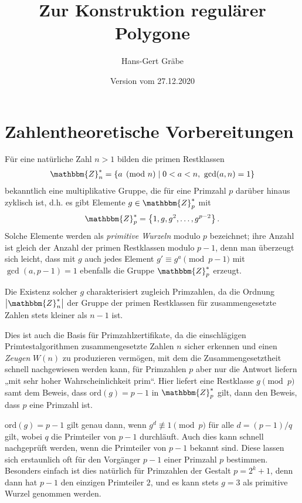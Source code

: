 \documentclass[11pt]{article}
\author{Hans-Gert Gräbe}
\title{Zur Konstruktion regulärer Polygone}
\date{Version vom 27.12.2020}
\newcommand{\cbr}[1]{\ensuremath{\left\{#1\right\}}}
\newcommand{\Z}{\mathbbm{Z}}
\begin{document}
 
\maketitle         

\section{Zahlentheoretische Vorbereitungen}

Für eine natürliche Zahl $n>1$ bilden die primen Restklassen
\begin{gather*}
  \Z_n^\ast=\cbr{a \pmod n \mid 0<a<n,\ \gcd(a,n)=1}
\end{gather*}
bekanntlich eine multiplikative Gruppe, die für eine Primzahl $p$ darüber
hinaus zyklisch ist, d.h. es gibt Elemente $g\in \Z_p^\ast$ mit
\begin{gather*}
  \Z_p^\ast=\cbr{1,g,g^2,\dots,g^{p-2}}.
\end{gather*}
Solche Elemente werden als \emph{primitive Wurzeln} modulo $p$ bezeichnet;
ihre Anzahl ist gleich der Anzahl der primen Restklassen modulo $p-1$, denn
man überzeugt sich leicht, dass mit $g$ auch jedes Element $g'\equiv g^a
\pmod{p-1}$ mit $\gcd(a,p-1)=1$ ebenfalls die Gruppe $\Z_p^\ast$ erzeugt.

Die Existenz solcher $g$ charakterisiert zugleich Primzahlen, da die Ordnung
$\left|\Z_n^\ast\right|$ der Gruppe der primen Restklassen für
zusammengesetzte Zahlen stets kleiner als $n-1$ ist.

Dies ist auch die Basis für Primzahlzertifikate, da die einschlägigen
Primtestalgorithmen zusammengesetzte Zahlen $n$ sicher erkennen und einen
\emph{Zeugen} $W(n)$ zu produzieren vermögen, mit dem die Zusammengesetztheit
schnell nachgewiesen werden kann, für Primzahlen $p$ aber nur die Antwort
liefern „mit sehr hoher Wahrscheinlichkeit prim“. Hier liefert eine Restklasse
$g \pmod p$ samt dem Beweis, dass $\mathrm{ord}(g)=p-1$ in $\Z_p^\ast$ gilt,
dann den Beweis, dass $p$ eine Primzahl ist.

$\mathrm{ord}(g)=p-1$ gilt genau dann, wenn $g^d\not\equiv 1\pmod p$ für alle
$d=(p-1)/q$ gilt, wobei $q$ die Primteiler von $p-1$ durchläuft. Auch dies
kann schnell nachgeprüft werden, wenn die Primteiler von $p-1$ bekannt sind.
Diese lassen sich erstaunlich oft für den Vorgänger $p-1$ einer Primzahl $p$
bestimmen. Besonders einfach ist dies natürlich für Primzahlen der Gestalt
$p=2^k+1$, denn dann hat $p-1$ den einzigen Primteiler $2$, und es kann stets
$g=3$ als primitive Wurzel genommen werden. 
\end{document}
